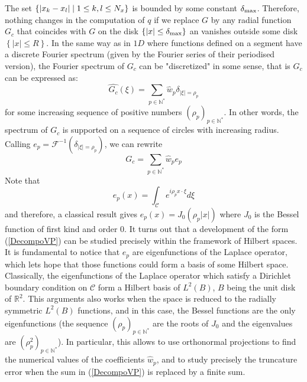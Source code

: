 \documentclass[11pt,a4paper]{article}
\begin{document}
The set $\left\{|x_k-x_l|\mathrel{}\middle|\mathrel{}1 \leq k,l \leq N_x\right\}$ is bounded by some constant $\delta_{\max}$. Therefore, nothing changes in the computation of $q$ if we replace $G$ by any radial function
$G_c$ that coincides with $G$ on the disk $\{|x| \leq \delta_{\max}\}$ an vanishes outside some disk $\left\{ |x| \leq R \right\}$. In the same way as in $1D$ where functions defined on a segment have a discrete Fourier spectrum (given by the Fourier series of their periodised version), the Fourier spectrum of $G_c$ can be "discretized" in some sense, that is $G_c$ can be expressed as:
\begin{equation}
\label{FourierDiscret}
\hat{G_c}(\xi) = \sum_{p \in \mathbb{N}^{*}} \hat{w}_p \delta_{|\xi| = \rho_p}
\end{equation} 
for some increasing sequence of positive numbers $(\rho_p)_{p \in \mathbb{N}^{*}}$. In other words, the spectrum of $G_c$ is supported on a sequence of circles with increasing radius. Calling $e_p = \mathcal{F}^{-1}(\delta_{|\xi|=\rho_p})$, we can rewrite 
\begin{equation}
\label{DecompoVP}
G_c = \sum_{p \in \mathbb{N}^*} \hat{w}_p e_p
\end{equation}
Note that 
\[e_p(x) = \int_{\mathcal{C}} e^{i \rho_p x\cdot \xi} d{\xi}\]
and therefore, a classical result gives $e_p(x) = J_0(\rho_p|x|)$ where $J_0$ is the Bessel function of first kind and order $0$. 
It turns out that a development of the form (\ref{DecompoVP}) can be studied precisely within the framework of Hilbert spaces. It is fundamental to notice that $e_p$ are eigenfunctions of the Laplace operator, which lets hope that those functions could form a basis of some Hilbert space. Classically, the eigenfunctions of the Laplace operator which satisfy a Dirichlet boundary condition on $\mathcal{C}$ form a Hilbert basis of $L^2(B)$, $B$ being the unit disk of $\mathbb{R}^2$. This arguments also works when the space is reduced to the radially symmetric $L^2(B)$ functions, and in this case, the Bessel functions are the only eigenfunctions (the sequence $(\rho_p)_{p \in \mathbb{N}^*}$ are the roots of $J_0$ and the eigenvalues are $(\rho_p^2)_{p \in \mathbb{N}^*}$). In particular, this allows to use orthonormal projections to find the numerical values of the coefficients $\hat{w}_{p}$, and to study precisely the truncature error when the sum in (\ref{DecompoVP}) is replaced by a finite sum. 
\end{document}
